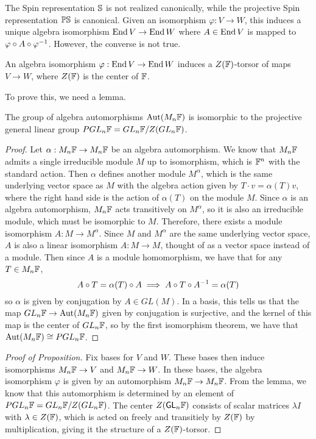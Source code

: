 The Spin representation $\S$ is not realized canonically,
while the projective Spin representation $\P\S$ is canonical. Given
an isomorphism $\varphi : V \to W$, this induces a unique algebra isomorphism
$\End V \to \End W$ where $A \in \End V$ is mapped to
$\varphi \circ A \circ \varphi\inv$. However, the converse is not true.
%
\begin{prop}
An algebra isomorphism $\varphi : \End V \to \End W$ induces a $Z(\F)$-torsor
of maps $V \to W$, where $Z(\F)$ is the center of $\F$.
\end{prop}
%
To prove this, we need a lemma.
%
\begin{lem}
The group of algebra automorphisms $\Aut(M_n\F)$ is isomorphic to the
projective general linear group $PGL_n\F = GL_n\F / Z(GL_n\F)$.
\end{lem}
%
\begin{proof}
Let $\alpha : M_n\F \to M_n\F$ be an algebra automorphism. We know that
$M_n\F$ admits a single irreducible module $M$ up to isomorphism,
which is $\F^n$ with the standard action. Then $\alpha$ defines another module
$M^\alpha$, which is the same underlying vector space as $M$ with the algebra
action given by $T \cdot v = \alpha(T)v$, where the right hand side is the action of
$\alpha(T)$ on the module $M$. Since $\alpha$ is an algebra automorphism,
$M_n\F$ acts transitively on $M^\alpha$, so it is also an irreducible module,
which must be isomorphic to $M$. Therefore, there exists a module isomorphism
$A : M \to M^\alpha$. Since $M$ and $M^\alpha$ are the same underlying vector
space, $A$ is also a linear isomorphism $A : M \to M$, thought of as a vector space
instead of a module. Then since $A$ is a module homomorphism, we have that
for any $T \in M_n\F$,
\[
A \circ T = \alpha(T) \circ A \implies A \circ T \circ A\inv = \alpha(T)
\]
so $\alpha$ is given by conjugation by $A \in GL(M)$. In a basis, this
tells us that the map $GL_n\F \to \Aut(M_n\F)$ given by conjugation is surjective,
and the kernel of this map is the center of $GL_n\F$, so by the first isomorphism
theorem, we have that $\Aut(M_n\F) \cong PGL_n\F$.
\end{proof}
%
\begin{proof}[Proof of Proposition]
Fix bases for $V$ and $W$. These bases then induce isomorphisms
$M_n\F \to V$ and $M_n\F \to W$. In these bases, the algebra
isomorphism $\varphi$ is given by an automorphism $M_n\F \to M_n\F$. From the
lemma, we know that this automorphism is determined by an element of
$PGL_n\F = GL_n\F / Z(GL_n\F)$. The center $Z(\GL_n\F)$ consists of
scalar matrices $\lambda I$ with $\lambda \in Z(\F)$, which is acted on
freely and transitiely by $Z(\F)$ by multiplication, giving it the structure
of a $Z(\F)$-torsor.
\end{proof}
